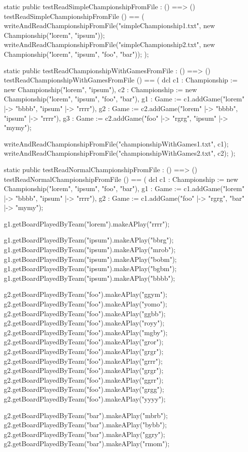 \begin{vdm_al}
 static public testReadSimpleChampionshipFromFile : () ==> ()
 testReadSimpleChampionshipFromFile () == (
  writeAndReadChampionshipFromFile("simpleChampionship1.txt",
   new Championship({"lorem", "ipsum"}));
  writeAndReadChampionshipFromFile("simpleChampionship2.txt",
   new Championship({"lorem", "ipsum", "foo", "bar"}));
 );

 static public testReadChampionshipWithGamesFromFile : () ==> ()
 testReadChampionshipWithGamesFromFile () == (
  dcl c1 : Championship := new Championship({"lorem", "ipsum"}),
   c2 : Championship := new Championship({"lorem", "ipsum", "foo", "bar"}),
   g1 : Game := c1.addGame({"lorem" |-> "bbbb", "ipsum" |-> "rrrr"}),
   g2 : Game := c2.addGame({"lorem" |-> "bbbb", "ipsum" |-> "rrrr"}),
   g3 : Game := c2.addGame({"foo" |-> "rgrg", "ipsum" |-> "mymy"});

   writeAndReadChampionshipFromFile("championshipWithGames1.txt", c1);
   writeAndReadChampionshipFromFile("championshipWithGames2.txt", c2);
  );

 static public testReadNormalChampionshipFromFile : () ==> ()
 testReadNormalChampionshipFromFile () == (
  dcl c1 : Championship := new Championship({"lorem", "ipsum", "foo", "bar"}),
   g1 : Game := c1.addGame({"lorem" |-> "bbbb", "ipsum" |-> "rrrr"}),
   g2 : Game := c1.addGame({"foo" |-> "rgrg", "bar" |-> "mymy"});

   g1.getBoardPlayedByTeam("lorem").makeAPlay("rrrr");

   g1.getBoardPlayedByTeam("ipsum").makeAPlay("bbrg");
   g1.getBoardPlayedByTeam("ipsum").makeAPlay("mrob");
   g1.getBoardPlayedByTeam("ipsum").makeAPlay("bobm");
   g1.getBoardPlayedByTeam("ipsum").makeAPlay("bgbm");
   g1.getBoardPlayedByTeam("ipsum").makeAPlay("bbbb");

   g2.getBoardPlayedByTeam("foo").makeAPlay("ggym");
   g2.getBoardPlayedByTeam("foo").makeAPlay("yomo");
   g2.getBoardPlayedByTeam("foo").makeAPlay("ggbb");
   g2.getBoardPlayedByTeam("foo").makeAPlay("royy");
   g2.getBoardPlayedByTeam("foo").makeAPlay("mgby");
   g2.getBoardPlayedByTeam("foo").makeAPlay("gror");
   g2.getBoardPlayedByTeam("foo").makeAPlay("grgr");
   g2.getBoardPlayedByTeam("foo").makeAPlay("grrr");
   g2.getBoardPlayedByTeam("foo").makeAPlay("grgr");
   g2.getBoardPlayedByTeam("foo").makeAPlay("ggrr");
   g2.getBoardPlayedByTeam("foo").makeAPlay("grgg");
   g2.getBoardPlayedByTeam("foo").makeAPlay("yyyy");

   g2.getBoardPlayedByTeam("bar").makeAPlay("mbrb");
   g2.getBoardPlayedByTeam("bar").makeAPlay("bybb");
   g2.getBoardPlayedByTeam("bar").makeAPlay("ggry");
   g2.getBoardPlayedByTeam("bar").makeAPlay("rmom");


\end{vdm_al}
